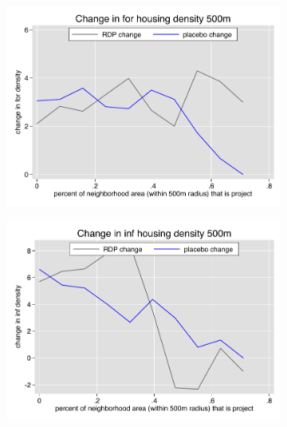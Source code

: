 \documentclass[12pt]{article}
\begin{document}
\begin{figure}
        \begin{subfigure}[b]{0.495\textwidth}
            \centering
            \includegraphics[width=\textwidth,trim={0.3cm .3cm 0.1cm 0cm}, clip=true]{figures/change_for_500_local.pdf}
        \end{subfigure}
        \hfill
        \begin{subfigure}[b]{0.495\textwidth}  
            \centering 
            \includegraphics[width=\textwidth,trim={0.3cm .3cm 0.1cm 0cm}, clip=true]{figures/change_inf_500_local.pdf}
        \end{subfigure}
        \vspace{-6mm}
  \end{figure} 
\end{document}
